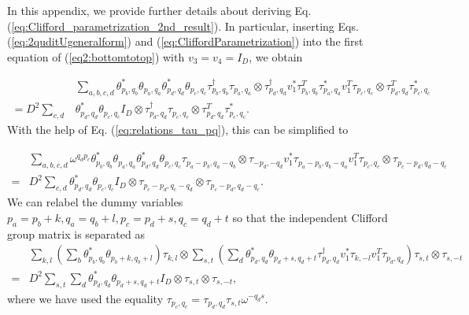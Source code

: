 \documentclass[aps,prx,twocolumn,notitlepage,nofootinbib,nobalancelastpage]{revtex4-2}
\theoremstyle{break}
\newcommand{\1}{\mathbbm{1}}
\theoremstyle{plain}
\theoremstyle{plain}
\theoremstyle{plain}
\begin{document}
In this appendix, we provide further details about deriving Eq. (\ref{eq:Clifford_parametrization_2nd_result}). In particular, inserting Eqs. (\ref{eq:2quditUgeneralform}) and (\ref{eq:CliffordParametrization}) into the first equation of (\ref{eq2:bottomtotop})
with $v_{3}=v_{4}=I_{D}$, we obtain
\begin{widetext}
\begin{align}
 & \sum_{a,b,c,d}\theta_{p_{b},q_{b}}^{*}\theta_{p_{a},q_{a}}\theta_{p_{d},q_{d}}^{*}\theta_{p_{c},q_{c}}\tau_{p_{b},q_{b}}^{\dagger}\tau_{p_{a},q_{a}}\otimes\tau_{p_{d},q_{d}}^{\dagger}v_{1}^{*}\tau_{p_{b},q_{b}}^{T}\tau_{p_{a},q_{a}}^{*}v_{1}^{T}\tau_{p_{c},q_{c}}\otimes\tau_{p_{d},q_{d}}^{T}\tau_{p_{c},q_{c}}^{*}\nonumber \\
=D^{2}\sum_{c,d} & \theta_{p_{d},q_{d}}^{*}\theta_{p_{c},q_{c}}I_{D}\otimes\tau_{p_{d},q_{d}}^{\dagger}\tau_{p_{c},q_{c}}\otimes\tau_{p_{d},q_{d}}^{T}\tau_{p_{c},q_{c}}^{*}.
\end{align}
With the help of Eq. (\ref{eq:relations_tau_pq}), this can be simplified to 

\begin{equation}
\begin{aligned} & \sum_{a,b,c,d}\omega^{q_{d}p_{c}}\theta_{p_{b},q_{b}}^{*}\theta_{p_{a},q_{a}}\theta_{p_{d},q_{d}}^{*}\theta_{p_{c},q_{c}}\tau_{p_{a}-p_{b},q_{a}-q_{b}}\otimes\tau_{-p_{d},-q_{d}}v_{1}^{*}\tau_{p_{a}-p_{b},q_{b}-q_{a}}v_{1}^{T}\tau_{p_{c},q_{c}}\otimes\tau_{p_{c}-p_{d},q_{d}-q_{c}}\\
= & D^{2}\sum_{c,d}\theta_{p_{d},q_{d}}^{*}\theta_{p_{c},q_{c}}I_{D}\otimes\tau_{p_{c}-p_{d},q_{c}-q_{d}}\otimes\tau_{p_{c}-p_{d},q_{d}-q_{c}}.
\end{aligned}
\end{equation}
We can relabel the dummy variables $p_{a}=p_{b}+k,q_{a}=q_{b}+l,p_{c}=p_{d}+s,q_{c}=q_{d}+t$
so that the independent Clifford group matrix is separated as
\begin{equation}
\begin{aligned} & \sum_{k,l}(\sum_{b}\theta_{p_{b},q_{b}}^{*}\theta_{p_{b}+k,q_{b}+l})\tau_{k,l}\otimes\sum_{s,t}(\sum_{d}\theta_{p_{d},q_{d}}^{*}\theta_{p_{d}+s,q_{d}+t}\tau_{p_{d},q_{d}}^{\dagger}v_{1}^{*}\tau_{k,-l}v_{1}^{T}\tau_{p_{d},q_{d}})\tau_{s,t}\otimes\tau_{s,-t}\\
= & D^{2}\sum_{s,t}\sum_{d}\theta_{p_{d},q_{d}}^{*}\theta_{p_{d}+s,q_{d}+t}I_{D}\otimes\tau_{s,t}\otimes\tau_{s,-t},
\end{aligned}
\label{eq:Clifford_equation_after_simpli}
\end{equation}
where we have used the equality $\tau_{p_{c},q_{c}}=\tau_{p_{d},q_{d}}\tau_{s,t}\omega^{-q_{d}s}$. 


\end{widetext}
\end{document}
